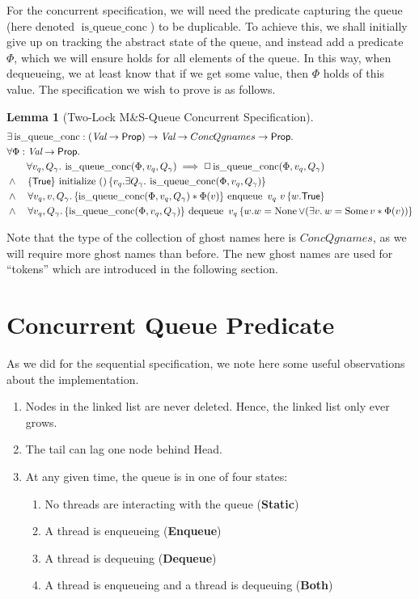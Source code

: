 \documentclass[a4paper, 10pt]{report}
\theoremstyle{definition}
\newtheorem{lemma}[theorem]{Lemma}
\newcommand{\initialise}{\operatorname{initialize}}
\newcommand{\enqueue}{\operatorname{enqueue}}
\newcommand{\dequeue}{\operatorname{dequeue}}
\newcommand{\msq}{M\&S-Queue\xspace}
\newcommand{\tlmsq}{Two-Lock \msq}
\newcommand{\isqueueconc}{\operatorname{is\_queue\_conc}}
\newcommand{\ConcQgnames}{ConcQgnames}
\newcommand{\vq}{v_q}
\newcommand{\nodeval}{\valB}
\newcommand{\absvalue}{\val}
\newcommand{\StaticState}{\textbf{Static}}
\newcommand{\EnqueueState}{\textbf{Enqueue}}
\newcommand{\DequeueState}{\textbf{Dequeue}}
\newcommand{\BothState}{\textbf{Both}}
\newcommand{\Qg}{Q_\gname}
\newcommand{\tlconcspecinit}{\hoare{\TRUE}{\initialise \ \TT}{\vq . \Exists \Qg. \isqueueconc(\Phi, \vq, \Qg)}}
\newcommand{\tlconcspecenq}{\All \vq, \absvalue, \Qg. \hoare{\isqueueconc(\Phi,\vq,\Qg) \star \Phi(\absvalue)}{\enqueue \ \vq \ \absvalue}{\valB . \TRUE}}
\newcommand{\tlconcspecdeq}{\All \vq, \Qg. \hoare{\isqueueconc(\Phi, \vq, \Qg)}{\dequeue \ \vq}{\nodeval . \nodeval = \None \lor (\Exists \absvalue. \nodeval = \Some \absvalue \star \Phi(\absvalue))}}
\begin{document}
For the concurrent specification, we will need the predicate capturing the queue (here denoted $\isqueueconc$) to be duplicable. To achieve this, we shall initially give up on tracking the abstract state of the queue, and instead add a predicate $\Phi$, which we will ensure holds for all elements of the queue. In this way, when dequeueing, we at least know that if we get some value, then $\Phi$ holds of this value. The specification we wish to prove is as follows.
\begin{lemma}[\tlmsq Concurrent Specification]\label{TLMSQ:spec:conc}
\begin{align*}
  &\Exists \isqueueconc : (\Val \to \Prop) \to \Val \to \ConcQgnames \to \Prop.\\
  &\All \Phi : \Val \to \Prop.\\
  &\quad\quad \All \vq, \Qg . \isqueueconc(\Phi, \vq, \Qg) \implies \persistently \isqueueconc(\Phi, \vq, \Qg)\\
  &\land\quad\tlconcspecinit\\
  &\land\quad\tlconcspecenq\\
  &\land\quad\tlconcspecdeq
\end{align*}
\end{lemma}
Note that the type of the collection of ghost names here is $\ConcQgnames$, as we will require more ghost names than before. The new ghost names are used for ``tokens'' which are introduced in the following section.

\section{Concurrent Queue Predicate}
\label{TLMSQCONC:section:conc-queue-pred}

As we did for the sequential specification, we note here some useful observations about the implementation.
\begin{enumerate}
  \item\label{TLMSQ:insights:oldnodes} Nodes in the linked list are never deleted. Hence, the linked list only ever grows.
  \item\label{TLMSQ:insights:lag} The tail can lag one node behind Head.
  \item\label{TLMSQ:insights:states} At any given time, the queue is in one of four states:
    \begin{enumerate}
      \item\label{TLMSQ:insights:state:static} No threads are interacting with the queue (\StaticState)
      \item\label{TLMSQ:insights:state:enqueue} A thread is enqueueing (\EnqueueState)
      \item\label{TLMSQ:insights:state:dequeue} A thread is dequeuing (\DequeueState)
      \item\label{TLMSQ:insights:state:both} A thread is enqueueing and a thread is dequeuing (\BothState)
    \end{enumerate}
\end{enumerate}
\end{document}
